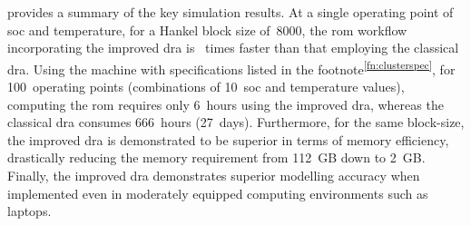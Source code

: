    provides   a   summary   of   the   key   simulation
results.  At  a  single  operating  point  of  \gls{soc}  and  temperature,  for
a  Hankel  block   size  of~8000,  the  \gls{rom}   workflow  incorporating  the
improved  \gls{dra}  is  ~times   faster  than  that  employing  the
classical   \gls{dra}.  Using   the  machine   with  specifications   listed  in
the  footnote\textsuperscript{\ref{fn:clusterspec}},  for  100~operating  points
(combinations of  10~\gls{soc} and temperature values),  computing the \gls{rom}
requires  only  6~hours using  the  improved  \gls{dra}, whereas  the  classical
\gls{dra} consumes  666~hours (27~days).  Furthermore, for the  same block-size,
the  improved \gls{dra}  is  demonstrated  to be  superior  in  terms of  memory
efficiency,  drastically reducing  the memory  requirement from  112~GB down  to
2~GB. Finally,  the improved \gls{dra} demonstrates  superior modelling accuracy
when  implemented even  in moderately  equipped computing  environments such  as
laptops.

